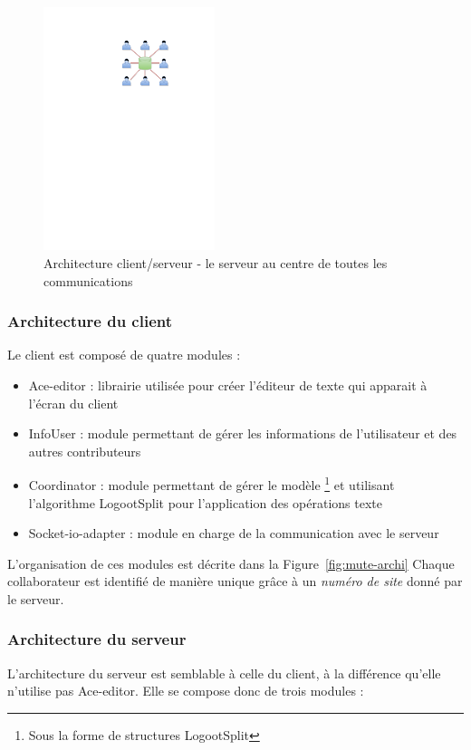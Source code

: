 \documentclass{tnreport}
\begin{document}
\begin{figure}[!h]
  \centering
  \includegraphics[width=5cm]{figures/client-server}
  \caption{Architecture client/serveur - le serveur au centre de toutes les communications}
  \label{fig:cli-serv}
\end{figure}



\subsubsection{Architecture du client}
Le client est composé de quatre modules :

\begin{itemize}
\item Ace-editor : librairie utilisée pour créer l'éditeur de texte qui apparait à l'écran du client
\item InfoUser : module permettant de gérer les informations de l'utilisateur et des autres contributeurs
\item Coordinator : module permettant de gérer le modèle \footnote{Sous la forme de structures LogootSplit} et utilisant l'algorithme LogootSplit pour l'application des opérations texte
\item Socket-io-adapter : module en charge de la communication avec le serveur
\end{itemize}

L'organisation de ces modules est décrite dans la Figure~\ref{fig:mute-archi} 
Chaque collaborateur est identifié de manière unique grâce à un \emph{numéro de site} donné par le serveur. 

\subsubsection{Architecture du serveur}
L'architecture du serveur est semblable à celle du client, à la différence qu'elle n'utilise pas Ace-editor.
Elle se compose donc de trois modules :
\end{document}
